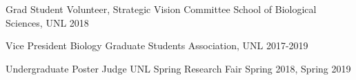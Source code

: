 \begin{cvoutreaches}
  \cvoutreach
    {Grad Student Volunteer, Strategic Vision Committee}
    {School of Biological Sciences, UNL}
    {2018}
    
  \cvoutreach
    {Vice President}
    {Biology Graduate Students Association, UNL}
    {2017-2019}
    
  \cvoutreach
    {Undergraduate Poster Judge}
    {UNL Spring Research Fair}
    {Spring 2018, Spring 2019}
\end{cvoutreaches}
